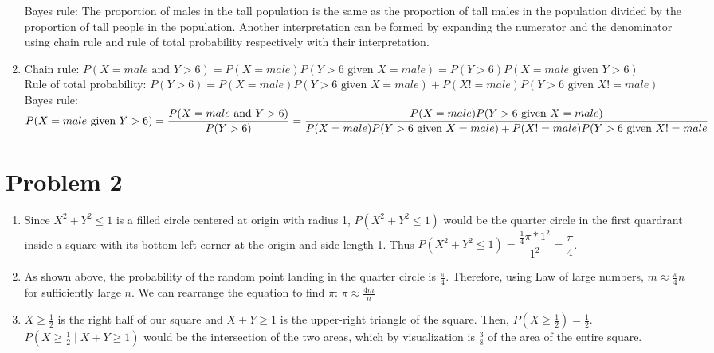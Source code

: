 \documentclass{article}
\begin{document}
\begin{enumerate}
          Bayes rule: The proportion of males in the tall population is the same as the proportion of tall males in the population divided by the proportion of tall people in the population. Another interpretation can be formed by expanding the numerator and the denominator using chain rule and rule of total probability respectively with their interpretation.
    \item
          Chain rule: $P(X=male\text{ and }Y>6)=P(X=male)P(Y>6\text{ given }X=male)=P(Y>6)P(X=male\text{ given }Y>6)$\\
          Rule of total probability: $P(Y>6)=P(X=male)P(Y>6\text{ given }X=male)+P(X!=male)P(Y>6\text{ given }X!=male)$\\
          Bayes rule: $P(X=male\text{ given }Y>6)=\dfrac{P(X=male\text{ and }Y>6)}{P(Y>6)}\\=\dfrac{P(X=male)P(Y>6\text{ given }X=male)}{P(X=male)P(Y>6\text{ given }X=male)+P(X!=male)P(Y>6\text{ given }X!=male}$
\end{enumerate}

\section*{Problem 2}
\begin{enumerate}
    \item Since $X^2+Y^2\leq 1$ is a filled circle centered at origin with radius 1, $P(X^2+Y^2\leq 1)$ would be the quarter circle in the first quardrant inside a square with its bottom-left corner at the origin and side length 1. Thus $P(X^2+Y^2\leq 1)=\dfrac{\frac{1}{4}\pi*1^2}{1^2}=\dfrac{\pi}{4}$.
    \item As shown above, the probability of the random point landing in the quarter circle is $\frac{\pi}{4}$. Therefore, using Law of large numbers, $m\approx\frac{\pi}{4}n$ for sufficiently large $n$. We can rearrange the equation to find $\pi$: $\pi\approx\frac{4m}{n}$
    \item $X\geq \frac{1}{2}$ is the right half of our square and $X+Y\geq 1$ is the upper-right triangle of the square. Then, $P(X\geq \frac{1}{2})=\frac{1}{2}$. $P(X\geq \frac{1}{2}\mid X+Y\geq 1)$ would be the intersection of the two areas, which by visualization is $\frac{3}{8}$ of the area of the entire square.
\end{enumerate}
\end{document}
